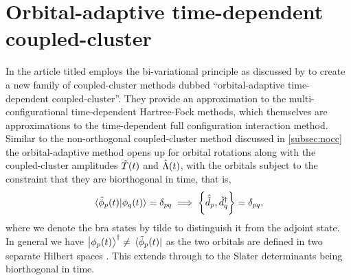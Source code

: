     \section{Orbital-adaptive time-dependent coupled-cluster}
        In the article titled 
        \citeauthor{kvaal2012ab} \cite{kvaal2012ab} employs the
        bi-variational principle as discussed by \citeauthor{arponen1983311}
        \cite{arponen1983311} to create a new family of coupled-cluster
        methods dubbed ``orbital-adaptive time-dependent
        coupled-cluster''.
        They provide an approximation to the multi-configurational
        time-dependent Hartree-Fock methods, which themselves are
        approximations to the time-dependent full configuration interaction
        method.
        Similar to the non-orthogonal coupled-cluster method discussed in
        \autoref{subsec:nocc} the orbital-adaptive method opens up for
        orbital rotations along with the coupled-cluster amplitudes
        $\hat{T}(t)$ and $\hat{\Lambda}(t)$, with the orbitals subject to the
        constraint that they are biorthogonal in time, that is,
        \begin{align}
            \braket*{\tilde{\phi}_p(t)}{\phi_q(t)} = \delta_{pq}
            \implies
            \left\{\hat{\tilde{d}}_{p}, \hat{d}^{\dagger}_{q}\right\}
            = \delta_{pq},
        \end{align}
        where we denote the bra states by tilde to distinguish it from the
        adjoint state.
        In general we have $\ket{\phi_p(t)}^{\dagger} \neq
        \bra*{\tilde{\phi}_p(t)}$ as the two orbitals are defined in two
        separate Hilbert spaces \cite{kvaal2012ab}.
        This extends through to the Slater determinants being biorthogonal
        in time.

